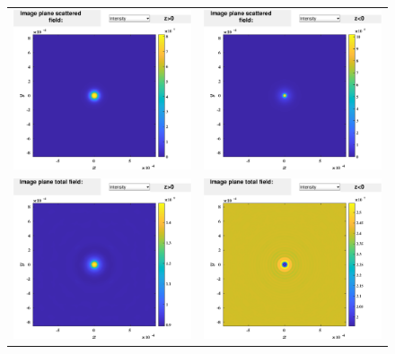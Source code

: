 \begin{figure}[H]
\begin{center}
\begin{tabular}{cc}
  \includegraphics*[width=7.0cm,draft=false]{test4imageposwf.eps}
&  \includegraphics*[width=7.0cm,draft=false]{test4imagenegwf.eps} \\
\includegraphics*[width=7.0cm,draft=false]{test4imageincposwf.eps}
&  \includegraphics*[width=7.0cm,draft=false]{test4imageincnegwf.eps}


\end{tabular}
\end{center}
\end{figure}
